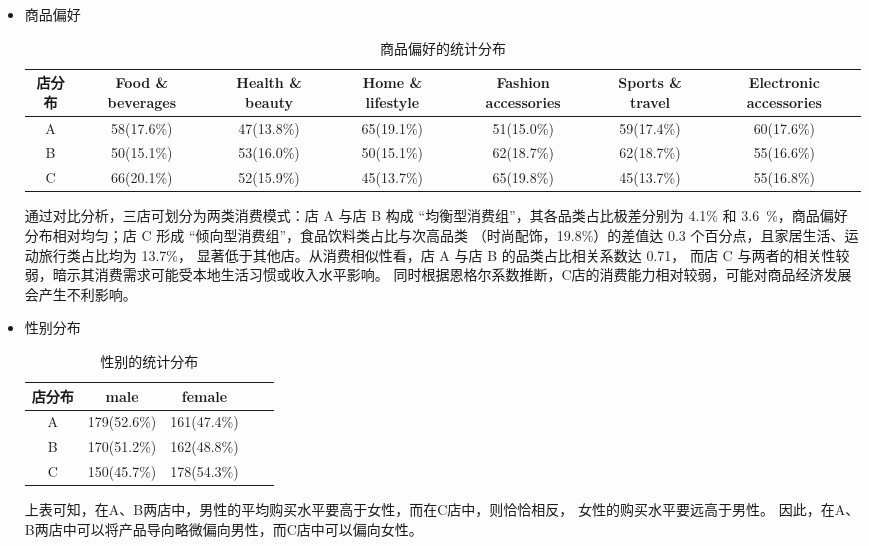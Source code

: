 \documentclass[withoutpreface,bwprint]{cumcmthesis}
\begin{document}
\begin{itemize}[itemindent=2em]
\item 商品偏好
\par
\begin{table}[H]
    \caption{商品偏好的统计分布}
    \centering
    \fontsize{10}{12}\selectfont  %
    \begin{tabularx}{\textwidth}{CCCCCCC}  %
        \toprule[1.5pt]
        店分布 & Food \& beverages & Health \& beauty & Home \& lifestyle & Fashion accessories & Sports \& travel & Electronic accessories \\ 
        \midrule[1pt]
        A & 58(17.6\%) & 47(13.8\%) & 65(19.1\%) & 51(15.0\%) & 59(17.4\%) & 60(17.6\%) \\
        B & 50(15.1\%) & 53(16.0\%) & 50(15.1\%) & 62(18.7\%) & 62(18.7\%) & 55(16.6\%) \\
        C & 66(20.1\%) & 52(15.9\%) & 45(13.7\%) & 65(19.8\%) & 45(13.7\%) & 55(16.8\%) \\ 
        \bottomrule[1.5pt]
    \end{tabularx}
\end{table}

通过对比分析，三店可划分为两类消费模式：店 A 与店 B 构成 “均衡型消费组”，其各品类占比极差分别为 4.1\% 和 3.6\
\%，商品偏好分布相对均匀；店 C 形成 “倾向型消费组”，食品饮料类占比与次高品类
（时尚配饰，19.8\%）的差值达 0.3 个百分点，且家居生活、运动旅行类占比均为 13.7\%，
显著低于其他店。从消费相似性看，店 A 与店 B 的品类占比相关系数达 0.71，
而店 C 与两者的相关性较弱，暗示其消费需求可能受本地生活习惯或收入水平影响。
同时根据恩格尔系数推断，C店的消费能力相对较弱，可能对商品经济发展会产生不利影响。



\item 性别分布
\par
\begin{table}[H]
    \caption{性别的统计分布}%
    \centering
    \fontsize{12}{14}\selectfont   
    \begin{tabular}{ccccc}
        \toprule[1.5pt]
        店分布 & male & female \\
        \midrule[1pt]
        A & 179(52.6\%) & 161(47.4\%)  \\
        B & 170(51.2\%) & 162(48.8\%)  \\
        C & 150(45.7\%) & 178(54.3\%)  \\
        \bottomrule[1.5pt]
    \end{tabular}
\end{table}
\par
上表可知，在A、B两店中，男性的平均购买水平要高于女性，而在C店中，则恰恰相反，
女性的购买水平要远高于男性。
因此，在A、B两店中可以将产品导向略微偏向男性，而C店中可以偏向女性。






\end{itemize}
\end{document}
